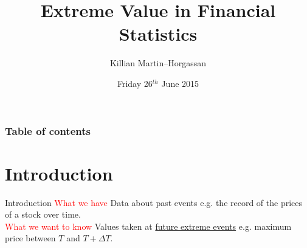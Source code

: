 \documentclass{beamer}
\title[Extreme Value in Financial Statistics]{Extreme Value in Financial Statistics} %
\author{Killian Martin--Horgassan} %
\institute[EPFL] %
{
Ecole Polytechnique F\'{e}d\'{e}rale de Lausanne \\ %
\medskip
\textit{killian.martin-horgassan@epfl.ch} %
}
\date{Friday 26$^{th}$ June 2015} %
\begin{document}
\begin{frame}
\titlepage %
\end{frame}

\begin{frame}
\frametitle{Table of contents} %
\tableofcontents %
\end{frame}


\section{Introduction} 
\begin{frame}{Introduction }
	\textcolor{red}{What we have} Data about past events e.g. the record of the prices of a stock over time.\newline \\
	\textcolor{red}{What we want to know} Values taken at \underline{future extreme events} e.g. maximum price between $T$ and $T + \Delta T$.
\end{frame}
\end{document}
